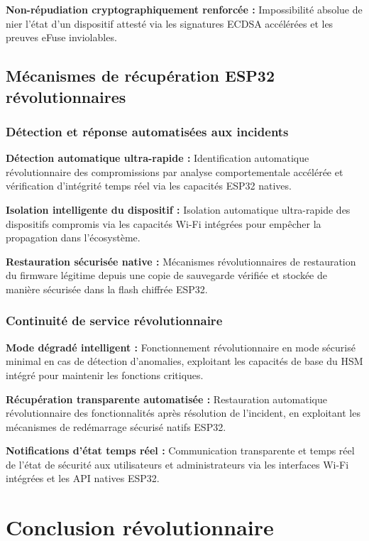 \textbf{Non-répudiation cryptographiquement renforcée :} Impossibilité absolue de nier l'état d'un dispositif attesté via les signatures ECDSA accélérées et les preuves eFuse inviolables.

\subsection{Mécanismes de récupération ESP32 révolutionnaires}

\subsubsection{Détection et réponse automatisées aux incidents}

\textbf{Détection automatique ultra-rapide :} Identification automatique révolutionnaire des compromissions par analyse comportementale accélérée et vérification d'intégrité temps réel via les capacités ESP32 natives.

\textbf{Isolation intelligente du dispositif :} Isolation automatique ultra-rapide des dispositifs compromis via les capacités Wi-Fi intégrées pour empêcher la propagation dans l'écosystème.

\textbf{Restauration sécurisée native :} Mécanismes révolutionnaires de restauration du firmware légitime depuis une copie de sauvegarde vérifiée et stockée de manière sécurisée dans la flash chiffrée ESP32.

\subsubsection{Continuité de service révolutionnaire}

\textbf{Mode dégradé intelligent :} Fonctionnement révolutionnaire en mode sécurisé minimal en cas de détection d'anomalies, exploitant les capacités de base du HSM intégré pour maintenir les fonctions critiques.

\textbf{Récupération transparente automatisée :} Restauration automatique révolutionnaire des fonctionnalités après résolution de l'incident, en exploitant les mécanismes de redémarrage sécurisé natifs ESP32.

\textbf{Notifications d'état temps réel :} Communication transparente et temps réel de l'état de sécurité aux utilisateurs et administrateurs via les interfaces Wi-Fi intégrées et les API natives ESP32.

\section{Conclusion révolutionnaire}

